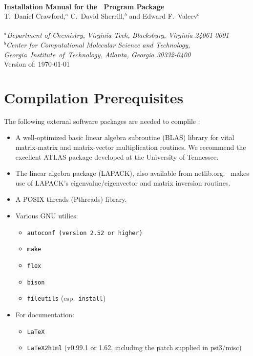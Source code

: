 \documentclass[12pt]{article}
\begin{document}


\begin{center}
\ \\
\vspace{2.0in}
{\bf {\Large Installation Manual for the \PSIthree\ Program Package}} \\
\vspace{0.5in}
T.\ Daniel Crawford,$^a$ C.\ David Sherrill,$^b$ and Edward F.\ Valeev$^b$ \\
\ \\
{\em $^a$Department of Chemistry, Virginia Tech, Blacksburg, Virginia 24061-0001} \\
\vspace{0.1in}
{\em $^b$Center for Computational Molecular Science and Technology, \mbox{Georgia 
Institute of Technology,} Atlanta, Georgia 30332-0400} 
\ \\
\vspace{0.3in}
Version of: \today
\end{center}

\thispagestyle{empty}

\newpage
\section{Compilation Prerequisites}

The following external software packages are needed to complile \PSIthree:
\begin{itemize}
\item A well-optimized basic linear algebra subroutine (BLAS) library
  for vital matrix-matrix and matrix-vector multiplication routines.
  We recommend the excellent ATLAS package developed at the University
  of Tennessee.  
\item The linear algebra package (LAPACK), also available from
  netlib.org.  \PSIthree\ makes use of LAPACK's eigenvalue/eigenvector
  and matrix inversion routines.  
\item A POSIX threads (Pthreads) library.
\item Various GNU utilies: 
\begin{itemize}
\item {\tt autoconf (version 2.52 or higher)}
\item {\tt make}
\item {\tt flex}
\item {\tt bison}
\item {\tt fileutils} (esp.\ {\tt install})
\end{itemize}
\item For documentation:
\begin{itemize}
\item {\tt LaTeX}
\item {\tt LaTeX2html} (v0.99.1 or 1.62, including the patch supplied in
psi3/misc)
\end{itemize}
\end{itemize}
\end{document}

